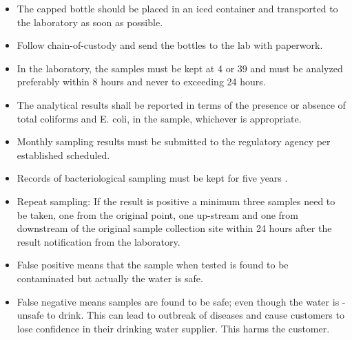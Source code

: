 \begin{itemize}
\item The capped bottle should be placed in an iced container and transported to the laboratory as soon as possible.
\item Follow chain-of-custody and send the bottles to the lab with paperwork.
\item In the laboratory, the samples must be kept at 4 or 39 and must be analyzed preferably within 8 hours and never to exceeding 24 hours.
\item The analytical results shall be reported in terms of the presence or absence of total coliforms and E. coli, in the sample, whichever is appropriate.
\item Monthly sampling results must be submitted to the regulatory agency per established scheduled.
\item Records of bacteriological sampling must be kept for five years .
\item Repeat sampling:  If the result is positive a minimum three samples need to be taken, one from the original point, one up-stream and one from downstream of the original sample collection site within 24 hours after the result notification from the laboratory.
\item False positive means that the sample when tested is found to be contaminated but
actually the water is safe.
\item False negative means samples are found to be safe; even though the water is
- unsafe to drink. This can lead to outbreak of diseases and cause customers to lose confidence in their drinking water supplier. This harms the customer. 
\end{itemize}
\newpage
